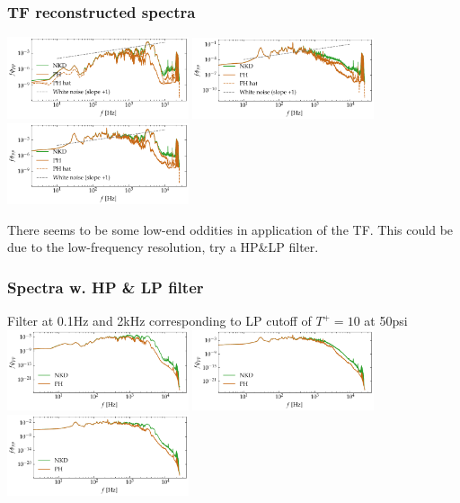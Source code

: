 \documentclass[aspectratio=169,9pt]{beamer}
\begin{document}
\begin{frame}
    \frametitle{TF reconstructed spectra}
        \centering
        \includegraphics[width=0.4\textwidth]{sanity/50psi/PH-NKD/calib_spectra_50psi_nn_recon.pdf}
        \includegraphics[width=0.4\textwidth]{sanity/50psi/PH-NKD/calib_spectra_50psi_fn_recon.pdf}
        \includegraphics[width=0.4\textwidth]{sanity/50psi/PH-NKD/calib_spectra_50psi_an_recon.pdf}

      \centering
      There seems to be some low-end oddities in application of the TF. This could be due to the low-frequency resolution, try a HP\&LP filter.
\end{frame}

\begin{frame}
    \frametitle{Spectra w. HP \& LP filter}
    Filter at 0.1Hz and 2kHz corresponding to LP cutoff of $T^+=10$ at 50psi
        \centering
        \includegraphics[width=0.4\textwidth]{sanity/50psi/PH-NKD/calib_spectra_50psi_nn_filt.pdf}
        \includegraphics[width=0.4\textwidth]{sanity/50psi/PH-NKD/calib_spectra_50psi_fn_filt.pdf}
        \includegraphics[width=0.4\textwidth]{sanity/50psi/PH-NKD/calib_spectra_50psi_an_filt.pdf}
\end{frame}
\end{document}
